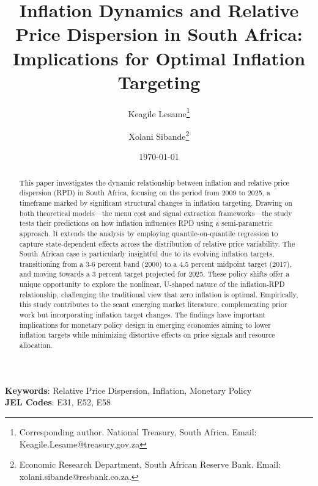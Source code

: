 \documentclass[
  letterpaper,
  DIV=11,
  numbers=noendperiod]{scrartcl}
\author{}
\date{}
\begin{document}
\title{Inflation Dynamics and Relative Price Dispersion in South Africa: Implications for Optimal Inflation Targeting}
\author {Keagile Lesame\footnote{Corresponding author. National Treasury, South Africa. Email: Keagile.Lesame@treasury.gov.za} \and
Xolani Sibande\footnote{Economic Research Department, South African Reserve Bank. Email: xolani.sibande@resbank.co.za.}}


\date{\today}
\maketitle

\begin{abstract}
This paper investigates the dynamic relationship between inflation and relative price dispersion (RPD) in South Africa, focusing on the period from 2009 to 2025, a timeframe marked by significant structural changes in inflation targeting. Drawing on both theoretical models—the menu cost and signal extraction frameworks—the study tests their predictions on how inflation influences RPD using a semi-parametric approach. It extends the analysis by employing quantile-on-quantile regression to capture state-dependent effects across the distribution of relative price variability. The South African case is particularly insightful due to its evolving inflation targets, transitioning from a 3-6 percent band (2000) to a 4.5 percent midpoint target (2017), and moving towards a 3 percent target projected for 2025. These policy shifts offer a unique opportunity to explore the nonlinear, U-shaped nature of the inflation-RPD relationship, challenging the traditional view that zero inflation is optimal. Empirically, this study contributes to the scant emerging market literature, complementing prior work but incorporating inflation target changes. The findings have important implications for monetary policy design in emerging economies aiming to lower inflation targets while minimizing distortive effects on price signals and resource allocation.
\end{abstract}

\noindent\textbf{Keywords}: Relative Price Dispersion, Inflation, Monetary Policy\\
\textbf{JEL Codes}: E31, E52, E58
\newpage
\end{document}
